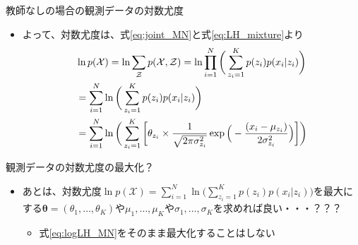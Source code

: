 \documentclass[aspectratio=169,unicode,dvipdfmx,14pt]{beamer}
\begin{document}
%


\begin{frame}{教師なしの場合の観測データの対数尤度}
\begin{itemize}
\item よって、対数尤度は、式\eqref{eq:joint_MN}と式\eqref{eq:LH_mixture}より
\vspace{-.1in}
\begin{align}
& \ln p(\mathcal{X}) = \ln \sum_{\mathcal{Z}} p(\mathcal{X}, \mathcal{Z})
= \ln \prod_{i=1}^N \bigg( \sum_{z_i=1}^K p(z_i) p(x_i | z_i) \bigg)
\notag \\ &
= \sum_{i=1}^N \ln \bigg( \sum_{z_i=1}^K p(z_i) p(x_i | z_i) \bigg)
\notag \\ &
= \sum_{i=1}^N \ln \bigg( \sum_{z_i=1}^K \bigg[ \theta_{z_i} \times \frac{1}{\sqrt{2\pi\sigma_{z_i}^2}}\exp\Big( - \frac{(x_i - \mu_{z_i})}{2\sigma_{z_i}^2} \Big) \bigg] \bigg)
\label{eq:logLH_MN}
\end{align}
\end{itemize}
\end{frame}

\begin{frame}{観測データの対数尤度の最大化？}
\begin{itemize}
\item あとは、対数尤度$\ln p(\mathcal{X}) = \sum_{i=1}^N \ln \Big( \sum_{z_i=1}^K p(z_i) p(x_i | z_i) \Big)$を最大にする$\bm{\theta}=(\theta_1,\ldots,\theta_K)$や$\mu_1,\ldots,\mu_K$や$\sigma_1,\ldots,\sigma_K$を求めれば良い・・・？？？
\begin{itemize}
\item 式\eqref{eq:logLH_MN}をそのまま最大化することはしない
\end{itemize}
\end{itemize}
\end{frame}
\end{document}

